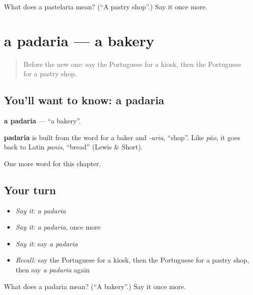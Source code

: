 \begin{tcolorbox}[breakable,colback=teal!4,colframe=teal!35!black,title={Before you move on}]
What does a pastelaria mean? (\textquotedblleft{}A pastry shop\textquotedblright{}.) Say it once more.
\end{tcolorbox}
\section[a padaria]{a padaria — a bakery}

\label{lesson:PT-C90-padaria}



\begin{quote}
Before the new one: say the Portuguese for a kiosk, then the Portuguese for a pastry shop.
\end{quote}

\subsection*{You'll want to know: a padaria}
\textbf{a padaria} — \textquotedblleft{}a bakery\textquotedblright{}.

\begin{cousinweb}
\textbf{padaria} is built from the word for a baker and \emph{-aria}, \textquotedblleft{}shop\textquotedblright{}. Like \emph{pão}, it goes back to Latin \emph{panis}, \textquotedblleft{}bread\textquotedblright{} (Lewis \& Short).
\end{cousinweb}

\begin{grammarlens}[title={What you've built}]
One more word for this chapter.
\end{grammarlens}

\subsection*{Your turn}
\begin{itemize}
\raggedright
  \item \emph{Say it:} \emph{a padaria}
  \item \emph{Say it:} \emph{a padaria}, once more
  \item \emph{Say it:} say \emph{a padaria}
  \item \emph{Recall:} say the Portuguese for a kiosk, then the Portuguese for a pastry shop, then say \emph{a padaria} again
\end{itemize}

\begin{tcolorbox}[breakable,colback=teal!4,colframe=teal!35!black,title={Before you move on}]
What does a padaria mean? (\textquotedblleft{}A bakery\textquotedblright{}.) Say it once more.
\end{tcolorbox}
